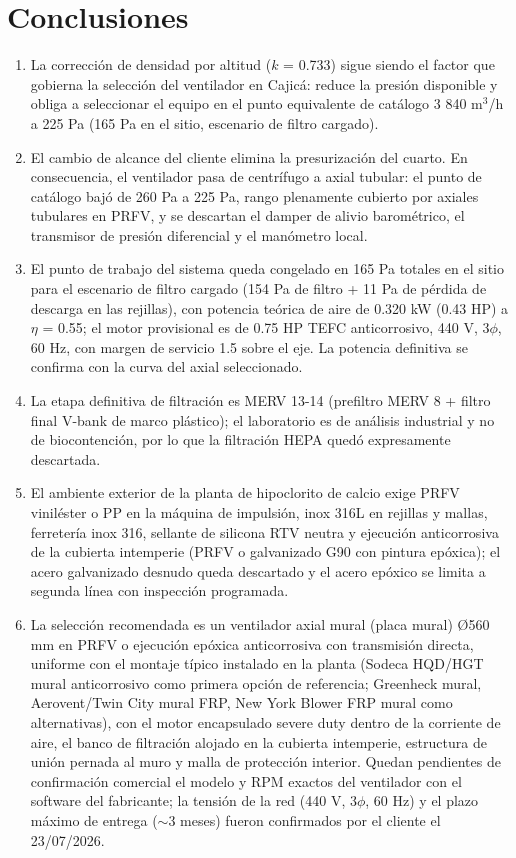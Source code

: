 \section{Conclusiones}

\begin{enumerate}
\item La corrección de densidad por altitud ($k$ = 0.733) sigue siendo el factor que gobierna la selección del ventilador en Cajicá: reduce la presión disponible y obliga a seleccionar el equipo en el punto equivalente de catálogo 3 840 m$^3$/h a 225 Pa (165 Pa en el sitio, escenario de filtro cargado).
\item El cambio de alcance del cliente elimina la presurización del cuarto. En consecuencia, el ventilador pasa de centrífugo a axial tubular: el punto de catálogo bajó de 260 Pa a 225 Pa, rango plenamente cubierto por axiales tubulares en PRFV, y se descartan el damper de alivio barométrico, el transmisor de presión diferencial y el manómetro local.
\item El punto de trabajo del sistema queda congelado en 165 Pa totales en el sitio para el escenario de filtro cargado (154 Pa de filtro + 11 Pa de pérdida de descarga en las rejillas), con potencia teórica de aire de 0.320 kW (0.43 HP) a $\eta$ = 0.55; el motor provisional es de 0.75 HP TEFC anticorrosivo, 440 V, 3$\phi$, 60 Hz, con margen de servicio 1.5 sobre el eje. La potencia definitiva se confirma con la curva del axial seleccionado.
\item La etapa definitiva de filtración es MERV 13-14 (prefiltro MERV 8 + filtro final V-bank de marco plástico); el laboratorio es de análisis industrial y no de biocontención, por lo que la filtración HEPA quedó expresamente descartada.
\item El ambiente exterior de la planta de hipoclorito de calcio exige PRFV viniléster o PP en la máquina de impulsión, inox 316L en rejillas y mallas, ferretería inox 316, sellante de silicona RTV neutra y ejecución anticorrosiva de la cubierta intemperie (PRFV o galvanizado G90 con pintura epóxica); el acero galvanizado desnudo queda descartado y el acero epóxico se limita a segunda línea con inspección programada.
\item La selección recomendada es un ventilador axial mural (placa mural) Ø560 mm en PRFV o ejecución epóxica anticorrosiva con transmisión directa, uniforme con el montaje típico instalado en la planta (Sodeca HQD/HGT mural anticorrosivo como primera opción de referencia; Greenheck mural, Aerovent/Twin City mural FRP, New York Blower FRP mural como alternativas), con el motor encapsulado severe duty dentro de la corriente de aire, el banco de filtración alojado en la cubierta intemperie, estructura de unión pernada al muro y malla de protección interior. Quedan pendientes de confirmación comercial el modelo y RPM exactos del ventilador con el software del fabricante; la tensión de la red (440 V, 3$\phi$, 60 Hz) y el plazo máximo de entrega ($\sim$3 meses) fueron confirmados por el cliente el 23/07/2026.
\end{enumerate}
